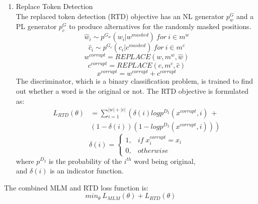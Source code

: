 \begin{enumerate}[topsep = 0pt, label=\roman*.]
\item Replace Token Detection \\
The replaced token detection (RTD) objective has an NL generator $p^G_w$ and a PL generator $p^G_c$ to produce alternatives for the randomly masked positions.
\begin{equation}
\label{eq:2.15}
\hat{w}_i \sim p^{G_w}(w_i|w^{masked})\ for\ i \in m^w
\end{equation}
\begin{equation}
\label{eq:2.16}
\hat{c}_i \sim p^{G_c}(c_i|c^{masked})\ for\ i \in m^c
\end{equation}
\begin{equation}
\label{eq:2.17}
w^{corrupt} = REPLACE(w,m^w, \hat{w})
\end{equation}
\begin{equation}
\label{eq:2.18}
c^{corrupt} = REPLACE(c, m^c, \hat{c})
\end{equation}
\begin{equation}
\label{eq:2.19}
x^{corrupt} = w^{corrupt} + c^{corrupt}
\end{equation}
The discriminator, which is a binary classification problem, is trained to find out whether a word is the original or not. The RTD objective is formulated as:
\begin{equation}
\label{eq:2.20}
\begin{split}
L_{RTD}(\theta) & = \sum_{i = 1}^{|w| + |c|} \left(\delta(i) log p^{D_2}(x^{corrupt}, i) \ + \right. \\
& \left. (1 - \delta(i))(1 - log p^{D_2}(x^{corrupt}, i))  \right)
\end{split}
\end{equation}
\begin{equation}
\label{eq:2.21}
\delta(i) = 
\begin{cases}
	1, & if\; x_i^{corrupt} = x_i \\
	0, & otherwise
\end{cases}       
\end{equation}
where $p^{D_2}$ is the probability of the $i^{th}$ word being original, \\
\hspace*{10mm} and $\delta(i)$ is an indicator function.
\end{enumerate}
The combined MLM and RTD loss function is:
\begin{equation}
\label{eq:2.22}
min_{\theta}\ L_{MLM}(\theta) + L_{RTD}(\theta)
\end{equation}

